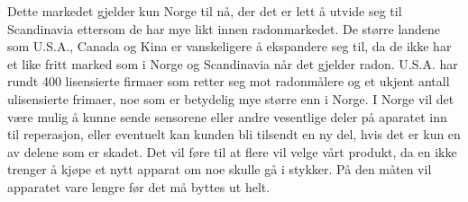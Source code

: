 Dette markedet gjelder kun Norge til nå, der det er lett å utvide seg til Scandinavia ettersom de har mye likt innen radonmarkedet. De større landene som U.S.A., Canada og Kina er vanskeligere å ekspandere seg til, da de ikke har et like fritt marked som i Norge og Scandinavia når det gjelder radon. U.S.A. har rundt 400 lisensierte firmaer som retter seg mot radonmålere og et ukjent antall ulisensierte frimaer, noe som er betydelig mye større enn i Norge. I Norge vil det være mulig å kunne sende sensorene eller andre vesentlige deler på aparatet inn til reperasjon, eller eventuelt kan kunden bli tilsendt en ny del, hvis det er kun en av delene som er skadet. Det vil føre til at flere vil velge vårt produkt, da en ikke trenger å kjøpe et nytt apparat om noe skulle gå i stykker. På den måten vil apparatet vare lengre før det må byttes ut helt. 




